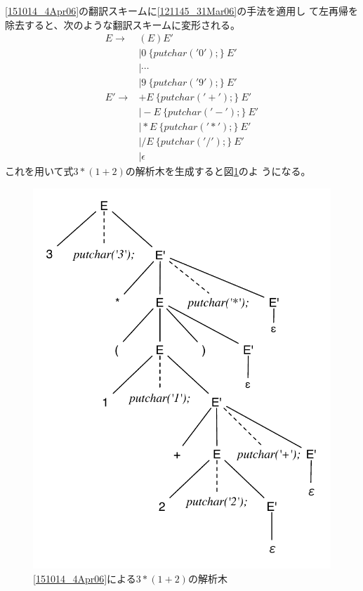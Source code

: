 \begin{example}
 \eqref{151014_4Apr06}の翻訳スキームに\ref{121145_31Mar06}の手法を適用し
 て左再帰を除去すると、次のような翻訳スキームに変形される。
 \begin{align*}
  E \rightarrow & (E)E' \\
     & \mid 0\ \{ putchar('0'); \}\ E' \\ 
     & \mid \cdots \\
     & \mid 9\ \{ putchar('9'); \}\ E' \\
  E' \rightarrow & +E\ \{ putchar('+'); \}\ E' \\
     & \mid -E\ \{ putchar('-'); \}\ E' \\
     & \mid \ast E\ \{ putchar('\ast'); \}\ E' \\
     & \mid /E\ \{ putchar('/'); \}\ E' \\
     & \mid \epsilon
 \end{align*}
 これを用いて式$3 * (1 + 2)$の解析木を生成すると図\ref{155248_4Apr06}のよ
 うになる。
\end{example}

\begin{figure}
 \begin{center}
  \includegraphics{figure/translation_scheme_no_left_recurs.pdf}
 \end{center}
 \caption{\eqref{151014_4Apr06}による$3 * (1 + 2)$の解析木}
 \label{155248_4Apr06}
\end{figure}


